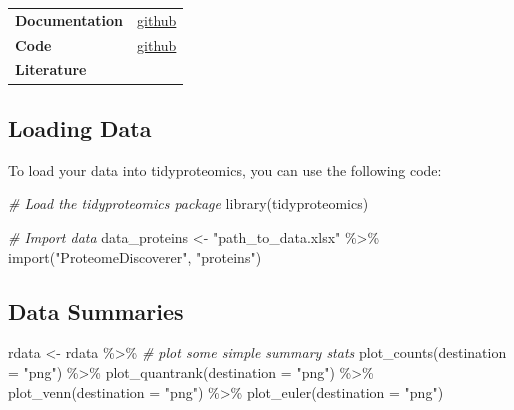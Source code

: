 \documentclass[
]{book}
\newenvironment{Shaded}{\begin{snugshade}}{\end{snugshade}}
\newcommand{\AttributeTok}[1]{\textcolor[rgb]{0.77,0.63,0.00}{#1}}
\newcommand{\CommentTok}[1]{\textcolor[rgb]{0.56,0.35,0.01}{\textit{#1}}}
\newcommand{\FunctionTok}[1]{\textcolor[rgb]{0.00,0.00,0.00}{#1}}
\newcommand{\NormalTok}[1]{#1}
\newcommand{\OtherTok}[1]{\textcolor[rgb]{0.56,0.35,0.01}{#1}}
\newcommand{\SpecialCharTok}[1]{\textcolor[rgb]{0.00,0.00,0.00}{#1}}
\newcommand{\StringTok}[1]{\textcolor[rgb]{0.31,0.60,0.02}{#1}}
\begin{document}
\begin{longtable}[]{@{}
  >{\raggedright\arraybackslash}p{}
  >{\raggedright\arraybackslash}p{}@{}}
\toprule\noalign{}
\endhead
\bottomrule\noalign{}
\endlastfoot
\textbf{Documentation} & \href{https://jeffsocal.github.io/tidyproteomics/}{github} \\
\textbf{Code} & \href{https://github.com/jeffsocal/tidyproteomics}{github} \\
\textbf{Literature} & \\
\end{longtable}

\hypertarget{loading-data-1}{%
\subsection{Loading Data}\label{loading-data-1}}

To load your data into tidyproteomics, you can use the following code:

\begin{Shaded}
\begin{Highlighting}[]
\CommentTok{\# Load the tidyproteomics package}
\FunctionTok{library}\NormalTok{(tidyproteomics)}

\CommentTok{\# Import data}
\NormalTok{data\_proteins }\OtherTok{\textless{}{-}} \StringTok{"path\_to\_data.xlsx"} \SpecialCharTok{\%\textgreater{}\%}
   \FunctionTok{import}\NormalTok{(}\StringTok{"ProteomeDiscoverer"}\NormalTok{, }\StringTok{"proteins"}\NormalTok{) }
\end{Highlighting}
\end{Shaded}

\hypertarget{data-summaries}{%
\subsection{Data Summaries}\label{data-summaries}}

\begin{Shaded}
\begin{Highlighting}[]
\NormalTok{rdata }\OtherTok{\textless{}{-}}\NormalTok{ rdata }\SpecialCharTok{\%\textgreater{}\%}
  \CommentTok{\# plot some simple summary stats}
  \FunctionTok{plot\_counts}\NormalTok{(}\AttributeTok{destination =} \StringTok{"png"}\NormalTok{) }\SpecialCharTok{\%\textgreater{}\%}
  \FunctionTok{plot\_quantrank}\NormalTok{(}\AttributeTok{destination =} \StringTok{"png"}\NormalTok{) }\SpecialCharTok{\%\textgreater{}\%}
  \FunctionTok{plot\_venn}\NormalTok{(}\AttributeTok{destination =} \StringTok{"png"}\NormalTok{) }\SpecialCharTok{\%\textgreater{}\%}
  \FunctionTok{plot\_euler}\NormalTok{(}\AttributeTok{destination =} \StringTok{"png"}\NormalTok{)}
\end{Highlighting}
\end{Shaded}
\end{document}
